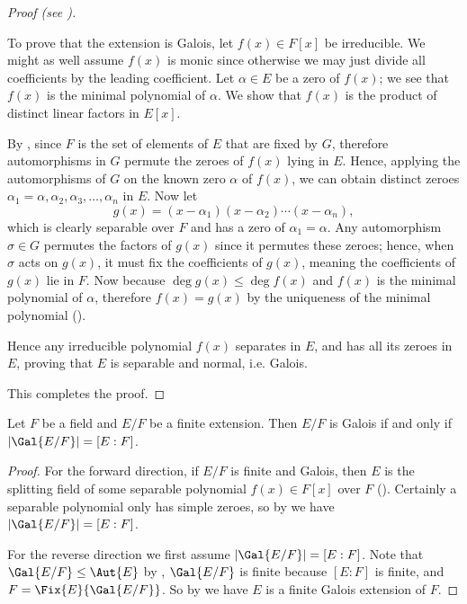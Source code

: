 \begin{proof}[Proof (see {\cite[Theorem 23.19]{judson_beezer_2022}})]
\begin{itemize}
        To prove that the extension is Galois, let $f(x) \in F[x]$ be irreducible. We might as well assume $f(x)$ is monic since otherwise we may just divide all coefficients by the leading coefficient. Let $\alpha \in E$ be a zero of $f(x)$; we see that $f(x)$ is the minimal polynomial of $\alpha$. We show that $f(x)$ is the product of distinct linear factors in $E[x]$.
        
        By , since $F$ is the set of elements of $E$ that are fixed by $G$, therefore automorphisms in $G$ permute the zeroes of $f(x)$ lying in $E$. Hence, applying the automorphisms of $G$ on the known zero $\alpha$ of $f(x)$, we can obtain distinct zeroes $\alpha_1 = \alpha, \alpha_2, \alpha_3, \dots, \alpha_n$ in $E$. Now let
        \[
            g(x) = (x-\alpha_1)(x-\alpha_2)\cdots(x-\alpha_n),
        \]
        which is clearly separable over $F$ and has a zero of $\alpha_1 = \alpha$. Any automorphism $\sigma \in G$ permutes the factors of $g(x)$ since it permutes these zeroes; hence, when $\sigma$ acts on $g(x)$, it must fix the coefficients of $g(x)$, meaning the coefficients of $g(x)$ lie in $F$. Now because $\deg g(x) \leq \deg f(x)$ and $f(x)$ is the minimal polynomial of $\alpha$, therefore $f(x) = g(x)$ by the uniqueness of the minimal polynomial ().
        
        Hence any irreducible polynomial $f(x)$ separates in $E$, and has all its zeroes in $E$, proving that $E$ is separable and normal, i.e. Galois.
    \end{itemize}
    This completes the proof.
\end{proof}

\begin{corollary}\label{corollary-galois-iff-galois-field-has-order-of-degree-of-field-extension}
    Let $F$ be a field and $E/F$ be a finite extension. Then $E/F$ is Galois if and only if $|\Gal{E/F}| = [E:F]$.
\end{corollary}
\begin{proof}
    For the forward direction, if $E/F$ is finite and Galois, then $E$ is the splitting field of some separable polynomial $f(x) \in F[x]$ over $F$ (). Certainly a separable polynomial only has simple zeroes, so by  we have $|\Gal{E/F}| = [E:F]$.

    For the reverse direction we first assume $|\Gal{E/F}| = [E:F]$. Note that $\Gal{E/F} \leq \Aut{E}$ by , $\Gal{E/F}$ is finite because $[E:F]$ is finite, and $F = \Fix{E}{\Gal{E/F}}$. So by  we have $E$ is a finite Galois extension of $F$.
\end{proof}

